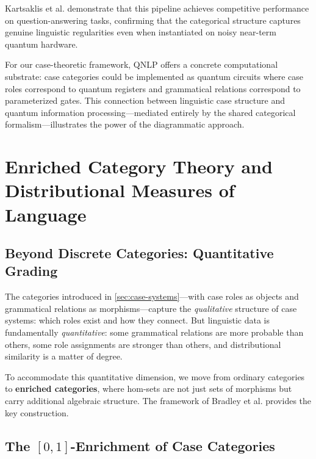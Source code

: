 \documentclass[
]{article}
\numberwithin{equation}{section}
\begin{document}
Kartsaklis et al. \citeyearpar{kartsaklis2021functorial} demonstrate
that this pipeline achieves competitive performance on
question-answering tasks, confirming that the categorical structure
captures genuine linguistic regularities even when instantiated on noisy
near-term quantum hardware.

For our case-theoretic framework, QNLP offers a concrete computational
substrate: case categories could be implemented as quantum circuits
where case roles correspond to quantum registers and grammatical
relations correspond to parameterized gates. This connection between
linguistic case structure and quantum information processing---mediated
entirely by the shared categorical formalism---illustrates the power of
the diagrammatic approach.

\newpage

\section{Enriched Category Theory and Distributional Measures of
Language}\label{sec:enriched-categories}

\subsection{Beyond Discrete Categories: Quantitative
Grading}\label{beyond-discrete-categories-quantitative-grading}

The categories introduced in \autoref{sec:case-systems}---with case
roles as objects and grammatical relations as morphisms---capture the
\emph{qualitative} structure of case systems: which roles exist and how
they connect. But linguistic data is fundamentally \emph{quantitative}:
some grammatical relations are more probable than others, some role
assignments are stronger than others, and distributional similarity is a
matter of degree.

To accommodate this quantitative dimension, we move from ordinary
categories to \textbf{enriched categories}, where hom-sets are not just
sets of morphisms but carry additional algebraic structure. The
framework of Bradley et al. \citeyearpar{fritz2021enriched} provides the
key construction.

\subsection{\texorpdfstring{The \([0,1]\)-Enrichment of Case
Categories}{The {[}0,1{]}-Enrichment of Case Categories}}\label{the-01-enrichment-of-case-categories}
\end{document}
